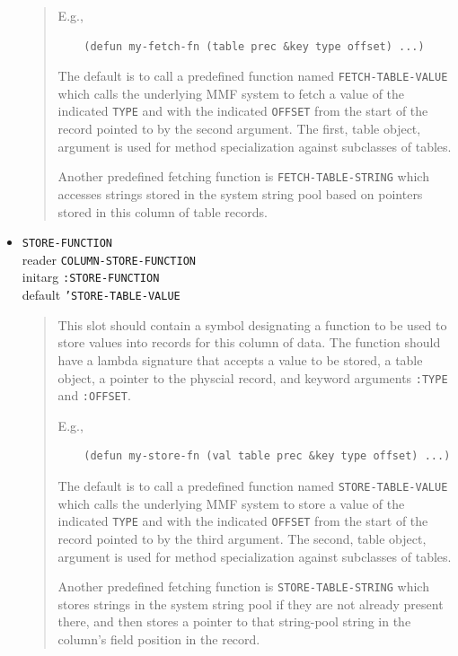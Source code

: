 \documentclass[article,oneside]{memoir}
\begin{document}
\begin{itemize}
\begin{quote}
E.g.,
\begin{verbatim}
	(defun my-fetch-fn (table prec &key type offset) ...)
\end{verbatim}

The default is to call a predefined function named \texttt{FETCH-TABLE-VALUE} which calls the underlying MMF system to fetch a value of the indicated \texttt{TYPE} and with the indicated \texttt{OFFSET} from the start of the record pointed to by the second argument. The first, table object, argument is used for method specialization against subclasses of tables.

Another predefined fetching function is \texttt{FETCH-TABLE-STRING} which accesses strings stored in the system string pool based on pointers stored in this column of table records.
\end{quote}


\item \texttt{STORE-FUNCTION} \\ 
reader \texttt{COLUMN-STORE-FUNCTION} \\ 
initarg \texttt{:STORE-FUNCTION} \\ 
default \texttt{'STORE-TABLE-VALUE}

\begin{quote}
This slot should contain a symbol designating a function to be used to store values into records for this column of data. The function should have a lambda signature that accepts a value to be stored, a table object, a pointer to the physcial record, and keyword arguments \texttt{:TYPE} and \texttt{:OFFSET}.

E.g.,
\begin{verbatim}
	(defun my-store-fn (val table prec &key type offset) ...)
\end{verbatim}

The default is to call a predefined function named \texttt{STORE-TABLE-VALUE} which calls the underlying MMF system to store a value of the indicated \texttt{TYPE} and with the indicated \texttt{OFFSET} from the start of the record pointed to by the third argument. The second, table object, argument is used for method specialization against subclasses of tables.

Another predefined fetching function is \texttt{STORE-TABLE-STRING} which stores strings in the system string pool if they are not already present there, and then stores a pointer to that string-pool string in the column's field position in the record.
\end{quote}



\end{itemize}
\end{document}
